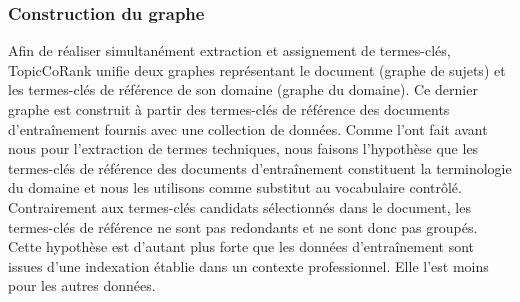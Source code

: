       \subsubsection{Construction du graphe}
      \label{subsubsec:main-domain_specific_keyphrase_annotation-supervised_automatic_keyphrase_extraction-topiccorank-graph_construction}
        Afin de réaliser simultanément extraction et assignement de termes-clés,
        TopicCoRank unifie deux graphes représentant le document (graphe de
        sujets) et les termes-clés de référence de son domaine (graphe du
        domaine). Ce dernier graphe est construit à partir des termes-clés de
        référence des documents d'entraînement fournis avec une collection de
        données. Comme  l'ont
        fait avant nous pour l'extraction de termes techniques, nous faisons
        l'hypothèse que les termes-clés de référence des documents
        d'entraînement constituent la terminologie du domaine et nous les
        utilisons comme substitut au vocabulaire contrôlé. Contrairement aux
        termes-clés candidats sélectionnés dans le document, les termes-clés de
        référence ne sont pas redondants et ne sont donc pas groupés. Cette
        hypothèse est d'autant plus forte que les données d'entraînement sont
        issues d'une indexation établie dans un contexte professionnel. Elle
        l'est moins pour les autres données.

